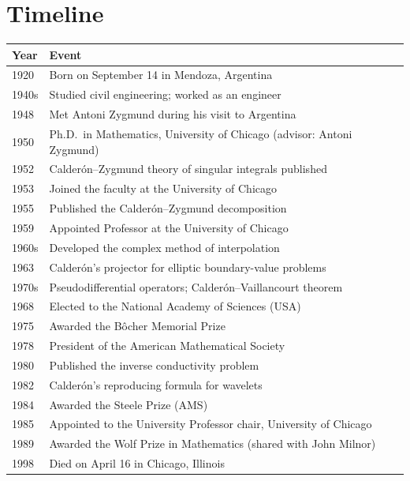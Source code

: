 \section*{Timeline}
\begin{tabularx}{\linewidth}{|p{1.5cm}|>{\raggedright\arraybackslash}X|}
\hline
\textbf{Year} & \textbf{Event} \\ \hline
1920 & Born on September 14 in Mendoza, Argentina \\ \hline
1940s & Studied civil engineering; worked as an engineer \\ \hline
1948 & Met Antoni Zygmund during his visit to Argentina \\ \hline
1950 & Ph.D.\ in Mathematics, University of Chicago (advisor: Antoni Zygmund) \\ \hline
1952 & Calder\'{o}n--Zygmund theory of singular integrals published \\ \hline
1953 & Joined the faculty at the University of Chicago \\ \hline
1955 & Published the Calder\'{o}n--Zygmund decomposition \\ \hline
1959 & Appointed Professor at the University of Chicago \\ \hline
1960s & Developed the complex method of interpolation \\ \hline
1963 & Calder\'{o}n's projector for elliptic boundary-value problems \\ \hline
1970s & Pseudodifferential operators; Calder\'{o}n--Vaillancourt theorem \\ \hline
1968 & Elected to the National Academy of Sciences (USA) \\ \hline
1975 & Awarded the B\^ocher Memorial Prize \\ \hline
1978 & President of the American Mathematical Society \\ \hline
1980 & Published the inverse conductivity problem \\ \hline
1982 & Calder\'{o}n's reproducing formula for wavelets \\ \hline
1984 & Awarded the Steele Prize (AMS) \\ \hline
1985 & Appointed to the University Professor chair, University of Chicago \\ \hline
1989 & Awarded the Wolf Prize in Mathematics (shared with John Milnor) \\ \hline
1998 & Died on April 16 in Chicago, Illinois \\ \hline
\end{tabularx}

